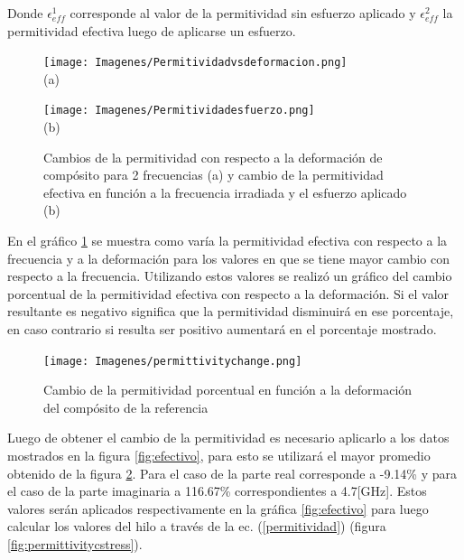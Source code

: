 \documentclass[12pt,letterpaper]{article}
\numberwithin{equation}{section}
\begin{document}
Donde $\epsilon^1_{eff}$ corresponde al valor de la permitividad sin esfuerzo aplicado y $\epsilon^2_{eff}$ la permitividad efectiva luego de aplicarse un esfuerzo.

\begin{figure}[H]
	\begin{minipage}{0.5\linewidth}
		\centering\texttt{[image: Imagenes/Permitividadvsdeformacion.png]}\\
		\centering(a)
	\end{minipage}
	\begin{minipage}{0.5\linewidth}
		\centering\texttt{[image: Imagenes/Permitividadesfuerzo.png]}\\
		\centering(b)
	\end{minipage}
	\caption{Cambios de la permitividad con respecto a la deformación de compósito para 2 frecuencias (a) y cambio de la permitividad efectiva en función a la frecuencia irradiada y el esfuerzo aplicado (b)}
	\label{fig:Permitividad_esfuerzo}
\end{figure}

En el gráfico \ref{fig:Permitividad_esfuerzo} se muestra como varía la permitividad efectiva con respecto a la frecuencia y a la deformación para los valores en que se tiene mayor cambio con respecto a la frecuencia. Utilizando estos valores se realizó un gráfico del cambio porcentual de la permitividad efectiva con respecto a la deformación. Si el valor resultante es negativo significa que la permitividad disminuirá en ese porcentaje, en caso contrario si resulta ser positivo aumentará en el porcentaje mostrado.

\begin{figure}[H]
	\centering\texttt{[image: Imagenes/permittivitychange.png]}\\
	\caption{Cambio de la permitividad porcentual en función a la deformación del compósito de la referencia \cite{Wire_backgound} }
	\label{fig:permittivitychange}
\end{figure} 

Luego de obtener el cambio de la permitividad es necesario aplicarlo a los datos mostrados en la figura \ref{fig:efectivo}, para esto se utilizará el mayor promedio obtenido de la figura \ref{fig:permittivitychange}. Para el caso de la parte real corresponde a -9.14\% y para el caso de la parte imaginaria a 116.67\% correspondientes a  4.7[GHz]. Estos valores serán aplicados respectivamente en la gráfica \ref{fig:efectivo} para luego calcular los valores del hilo a través de la ec. (\ref{permitividad}) (figura \ref{fig:permittivitycstress}).
\end{document}

